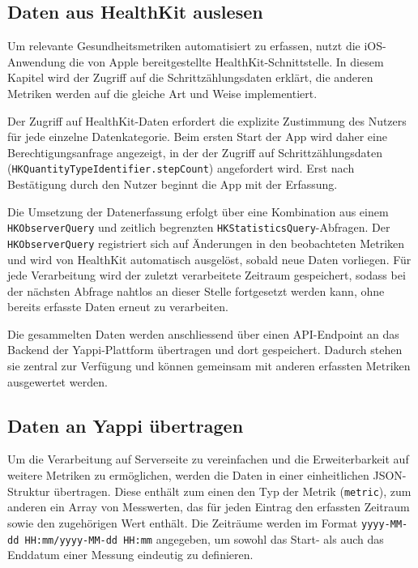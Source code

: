 \documentclass[12pt,a4paper]{report}
\begin{document}
\subsection{Daten aus HealthKit auslesen}

Um relevante Gesundheitsmetriken automatisiert zu erfassen, nutzt die iOS-Anwendung die von Apple bereitgestellte
HealthKit-Schnittstelle. In diesem Kapitel wird der Zugriff auf die Schrittzählungsdaten erklärt, die anderen Metriken werden
auf die gleiche Art und Weise implementiert. 

Der Zugriff auf HealthKit-Daten erfordert die explizite Zustimmung des Nutzers für jede einzelne Datenkategorie. Beim ersten Start
der App wird daher eine Berechtigungsanfrage angezeigt, in der der Zugriff auf Schrittzählungsdaten 
(\texttt{HKQuantityTypeIdentifier.stepCount}) angefordert wird. Erst nach Bestätigung durch den Nutzer beginnt die App mit der
Erfassung.

Die Umsetzung der Datenerfassung erfolgt über eine Kombination aus einem \texttt{HKObserverQuery} und zeitlich begrenzten 
\texttt{HKStatisticsQuery}-Abfragen. Der \texttt{HKObserverQuery} registriert sich auf Änderungen in den beobachteten Metriken und
wird von HealthKit automatisch ausgelöst, sobald neue Daten vorliegen. Für jede Verarbeitung wird der zuletzt verarbeitete 
Zeitraum gespeichert, sodass bei der nächsten Abfrage nahtlos an dieser Stelle fortgesetzt werden kann, ohne bereits erfasste
Daten erneut zu verarbeiten.

Die gesammelten Daten werden anschliessend über einen API-Endpoint an das Backend der Yappi-Plattform übertragen und dort
gespeichert. Dadurch stehen sie zentral zur Verfügung und können gemeinsam mit anderen erfassten Metriken ausgewertet werden. 

\subsection{Daten an Yappi übertragen}

Um die Verarbeitung auf Serverseite zu vereinfachen und die Erweiterbarkeit auf weitere Metriken zu ermöglichen, werden die Daten
in einer einheitlichen JSON-Struktur übertragen. Diese enthält zum einen den Typ der Metrik (\texttt{metric}), zum anderen ein Array
von Messwerten, das für jeden Eintrag den erfassten Zeitraum sowie den zugehörigen Wert enthält. Die Zeiträume werden im
Format \texttt{yyyy-MM-dd~HH:mm/yyyy-MM-dd~HH:mm} angegeben, um sowohl das Start- als auch das Enddatum einer Messung eindeutig
zu definieren.
\end{document}
